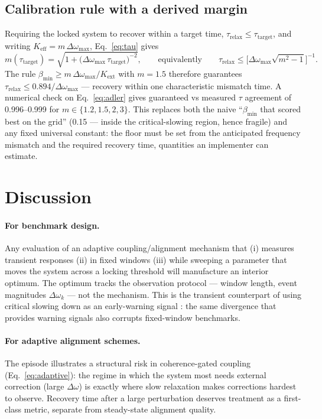\documentclass[11pt]{article}
\newcommand{\Keff}{K_{\mathrm{eff}}}
\newcommand{\bmin}{\beta_{\min}}
\newcommand{\dw}{\Delta\omega}
\newcommand{\taurelax}{\tau_{\mathrm{relax}}}
\begin{document}
\subsection{Calibration rule with a derived margin}\label{sec:calibration}

Requiring the locked system to recover within a target time,
$\taurelax \le \tau_{\mathrm{target}}$, and writing $\Keff = m\,\dw_{\max}$,
Eq.~\eqref{eq:tau} gives
\begin{equation}\label{eq:margin}
m(\tau_{\mathrm{target}}) = \sqrt{1 + \bigl(\dw_{\max}\,\tau_{\mathrm{target}}\bigr)^{-2}},
\qquad\text{equivalently}\qquad
\taurelax \le \bigl[\dw_{\max}\sqrt{m^2-1}\bigr]^{-1}.
\end{equation}
The rule $\bmin \ge m\,\dw_{\max}/K_{\mathrm{ext}}$ with $m=1.5$ therefore
guarantees $\taurelax \le 0.894/\dw_{\max}$ --- recovery within one
characteristic mismatch time. A numerical check on Eq.~\eqref{eq:adler} gives
guaranteed vs measured $\tau$ agreement of 0.996--0.999 for
$m \in \{1.2, 1.5, 2, 3\}$. This replaces both the naive ``$\bmin$ that scored
best on the grid'' (0.15 --- inside the critical-slowing region, hence
fragile) and any fixed universal constant: the floor must be set from the
anticipated frequency mismatch and the required recovery time, quantities an
implementer can estimate.

\section{Discussion}\label{sec:discussion}

\paragraph{For benchmark design.} Any evaluation of an adaptive
coupling/alignment mechanism that (i) measures transient responses (ii) in
fixed windows (iii) while sweeping a parameter that moves the system across a
locking threshold will manufacture an interior optimum. The optimum tracks the
observation protocol --- window length, event magnitudes $\dw_k$ --- not the
mechanism. This is the transient counterpart of using critical slowing down as
an early-warning signal \cite{scheffer2009}: the same divergence that provides
warning signals also corrupts fixed-window benchmarks.

\paragraph{For adaptive alignment schemes.} The episode illustrates a
structural risk in coherence-gated coupling (Eq.~\eqref{eq:adaptive}): the
regime in which the system most needs external correction (large $\dw$) is
exactly where slow relaxation makes corrections hardest to observe. Recovery
time after a large perturbation deserves treatment as a first-class metric,
separate from steady-state alignment quality.
\end{document}
